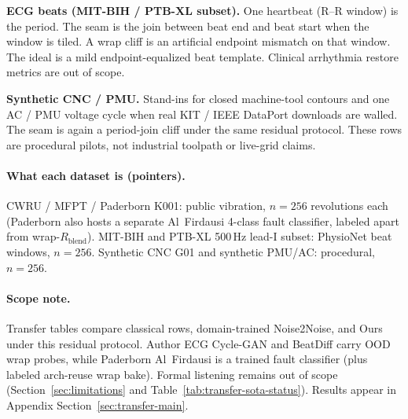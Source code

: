 \textbf{ECG beats (MIT-BIH / PTB-XL subset).}
One heartbeat (R--R window) is the period.
The seam is the join between beat end and beat start when the window is tiled.
A wrap cliff is an artificial endpoint mismatch on that window.
The ideal is a mild endpoint-equalized beat template.
Clinical arrhythmia restore metrics are out of scope.

\textbf{Synthetic CNC / PMU.}
Stand-ins for closed machine-tool contours and one AC / PMU voltage cycle when real KIT / IEEE DataPort downloads are walled.
The seam is again a period-join cliff under the same residual protocol.
These rows are procedural pilots, not industrial toolpath or live-grid claims.

\paragraph{What each dataset is (pointers).}
CWRU / MFPT / Paderborn K001: public vibration, $n{=}256$ revolutions each (Paderborn also hosts a separate Al~Firdausi 4-class fault classifier, labeled apart from wrap-$R_{\mathrm{blend}}$).
MIT-BIH and PTB-XL 500\,Hz lead-I subset: PhysioNet beat windows, $n{=}256$.
Synthetic CNC G01 and synthetic PMU/AC: procedural, $n{=}256$.

\paragraph{Scope note.}
Transfer tables compare classical rows, domain-trained Noise2Noise, and Ours under this residual protocol.
Author ECG Cycle-GAN and BeatDiff carry OOD wrap probes, while Paderborn Al~Firdausi is a trained fault classifier (plus labeled arch-reuse wrap bake).
Formal listening remains out of scope (Section~\ref{sec:limitations} and Table~\ref{tab:transfer-sota-status}).
Results appear in Appendix Section~\ref{sec:transfer-main}.
